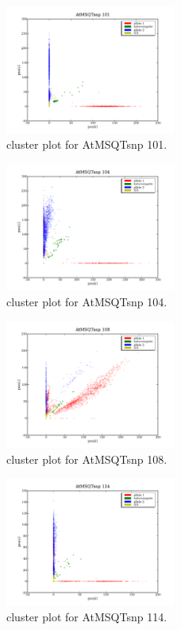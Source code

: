 \begin{figure}[H]
\includegraphics[width=0.5\textwidth]{figures/cluster_plot_AtMSQTsnp_101.png}
\caption{cluster plot for AtMSQTsnp 101.} \label{flAtMSQTsnp101}
\end{figure}
\begin{figure}[H]
\includegraphics[width=0.5\textwidth]{figures/cluster_plot_AtMSQTsnp_104.png}
\caption{cluster plot for AtMSQTsnp 104.} \label{flAtMSQTsnp104}
\end{figure}
\begin{figure}[H]
\includegraphics[width=0.5\textwidth]{figures/cluster_plot_AtMSQTsnp_108.png}
\caption{cluster plot for AtMSQTsnp 108.} \label{flAtMSQTsnp108}
\end{figure}
\begin{figure}[H]
\includegraphics[width=0.5\textwidth]{figures/cluster_plot_AtMSQTsnp_114.png}
\caption{cluster plot for AtMSQTsnp 114.} \label{flAtMSQTsnp114}
\end{figure}
